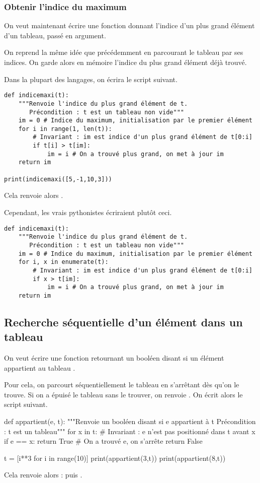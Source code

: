 \subsubsection{Obtenir l'indice du maximum}
On veut maintenant écrire une fonction  donnant l'indice d'un plus grand élément d'un tableau, passé en argument.


On reprend la même idée que précédemment en parcourant le tableau par ses indices. On garde alors 
en mémoire l'indice du plus grand élément déjà trouvé.

Dans la plupart des langages, on écrira le script suivant.
\begin{lstlisting}
def indicemaxi(t):
    """Renvoie l'indice du plus grand élément de t.
       Précondition : t est un tableau non vide"""
    im = 0 # Indice du maximum, initialisation par le premier élément
    for i in range(1, len(t)):
        # Invariant : im est indice d'un plus grand élément de t[0:i]
        if t[i] > t[im]:
            im = i # On a trouvé plus grand, on met à jour im
    return im
    
print(indicemaxi([5,-1,10,3]))
\end{lstlisting}

Cela renvoie alors .

Cependant, les vrais pythonistes écriraient plutôt ceci. 
\begin{lstlisting}
def indicemaxi(t):
    """Renvoie l'indice du plus grand élément de t.
       Précondition : t est un tableau non vide"""
    im = 0 # Indice du maximum, initialisation par le premier élément
    for i, x in enumerate(t):
        # Invariant : im est indice d'un plus grand élément de t[0:i]
        if x > t[im]:
            im = i # On a trouvé plus grand, on met à jour im
    return im
\end{lstlisting}



\subsection{Recherche séquentielle d'un élément dans un tableau}

On veut écrire une fonction  retournant un booléen disant si un
élément  appartient au tableau . 

Pour cela, on parcourt séquentiellement le tableau en s'arrêtant dès qu'on le trouve. Si on a épuisé 
le tableau sans le trouver, on renvoie . 
On écrit alors le script suivant.
\begin{pyverbatim}
def appartient(e, t):
    """Renvoie un booléen disant si e appartient à t
       Précondition : t est un tableau"""
    for x in t:
        # Invariant : e n'est pas positionné dans t avant x
        if e == x:
            return True # On a trouvé e, on s'arrête
    return False
 
t = [i**3 for i in range(10)]
print(appartient(3,t))
print(appartient(8,t))
\end{pyverbatim}
Cela renvoie alors :
 puis .

